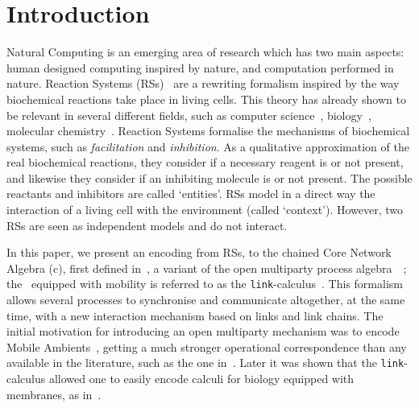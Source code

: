 
\section{Introduction}

Natural Computing is an emerging area of research which has two main 
aspects: human designed computing inspired by nature, and computation 
performed in nature. Reaction Systems (RSs)~\cite{BEMR11} are 
a rewriting formalism
inspired by the way biochemical reactions take place in living 
cells.  
This theory has already shown to be relevant in several different 
fields, such as computer science~\cite{MPR15}, 
biology~\cite{ABP14,CMMBM12,Az17,BarbutiGLM16}, 
molecular chemistry~\cite{OY16}.
Reaction Systems formalise the mechanisms of biochemical systems, 
such as {\em facilitation} and {\em inhibition}. 
As a qualitative approximation of the real biochemical reactions, they
consider if a necessary reagent is or not present, and likewise they
consider if an inhibiting molecule is or not present. 
The  possible reactants and inhibitors are called `entities'.
RSs model in a direct way the interaction of a living cell
with the environment (called `context'). However, two RSs are seen
as independent models and do not interact.


{\color{red}In this paper, we present an encoding from RSs, 
to the chained Core Network  Algebra (c\CNA), first defined in~\cite{BBF19}, a variant of the 
 open multiparty process algebra~\CNA~\cite{BBB17}; the \CNA~equipped with mobility is referred to as the {\tt link}-calculus~\cite{BODEI2020104587}}.
This formalism allows several processes to synchronise and 
communicate altogether, at the same time, with a new interaction
mechanism based on links and link chains. 
The initial motivation for introducing
{\color{red} an open multiparty mechanism}
was to encode
Mobile Ambients~\cite{CardelliG00}, getting a much stronger operational
correspondence than any available in the literature, such as the one in~\cite{B16}.
Later it was shown that the {\tt link}-calculus allowed one to easily encode calculi for biology equipped with membranes, as in~\cite{BodeiBBC14}.

